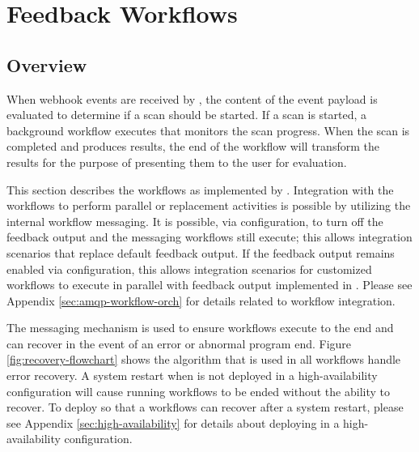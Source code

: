 \chapter{Feedback Workflows}\label{sec:feedback-workflows}


\section{Overview}

When webhook events are received by \cxoneflow, the content of the event
payload is evaluated to determine if a scan should be started.  If a scan
is started, a background workflow executes that monitors the scan progress.
When the scan is completed and produces results, the end of the workflow
will transform the results for the purpose of presenting them to the user
for evaluation.

This section describes the workflows as implemented by \cxoneflow.  Integration
with the workflows to perform parallel or replacement activities is possible
by utilizing the internal workflow messaging. It is possible, via configuration,
to turn off the feedback output and the messaging workflows still execute; this
allows integration scenarios that replace default feedback output.  If the
feedback output remains enabled via configuration, this allows integration
scenarios for customized workflows to execute in parallel with feedback
output implemented in \cxoneflow. Please see Appendix 
\ref{sec:amqp-workflow-orch} for details related to workflow integration.

The messaging mechanism is used to ensure workflows execute to the end
and can recover in the event of an error or abnormal program end.  Figure
\ref{fig:recovery-flowchart} shows the algorithm that is used
in all workflows handle error recovery.  A system restart when \cxoneflow
is not deployed in a high-availability configuration will cause running workflows
to be ended without the ability to recover.  To deploy \cxoneflow so that
a workflows can recover after a system restart, please see
Appendix \ref{sec:high-availability} for details about deploying \cxoneflow
in a high-availability configuration.


